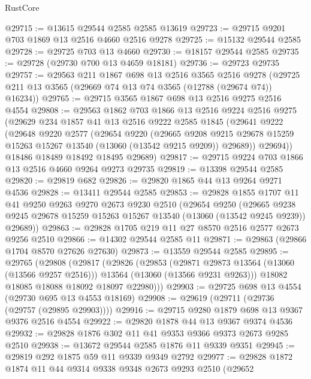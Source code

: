 \begin{lexlean}{RustCore}
\begin{coremodule}
@29715 := @13615 @29544 @2585 @2585 @13619
@29723 := @29715 @9201 @703 @1869 @13 @2516 @4660 @2516 @9278
@29725 := @15132 @29544 @2585
@29728 := @29725 @703 @13 @4660
@29730 := @18157 @29544 @2585
@29735 := @29728 (@29730 @700 @13 @4659 @18181)
@29736 := @29723 @29735
@29757 := @29563
    @211
    @1867
    @698
    @13
    @2516
    @3565
    @2516
    @9278
    (@29725 @211 @13 @3565 (@29669 @74 @13 @74 @3565 (@12788 (@29674 @74)) @16234))
@29765 := @29715 @3565 @1867 @698 @13 @2516 @9275 @2516 @4554
@29808 := @29563
    @1862
    @703
    @1866
    @13
    @2516
    @9224
    @2516
    @9275
    (@29629
      @234
      @1857
      @41
      @13
      @2516
      @9222
      @2585
      @1845
      (@29641
        @9222
        (@29648
          @9220
          @2577
          (@29654
            @9220
            (@29665
              @9208
              @9215
              @29678
              @15259
              @15263
              @15267
              @13540
              (@13060 (@13542 @9215 @9209))
              @29689))
          @29694))
      @18486
      @18489
      @18492
      @18495
      @29689)
@29817 := @29715 @9224 @703 @1866 @13 @2516 @4660 @9264 @9273 @29735
@29819 := @13398 @29544 @2585
@29820 := @29819 @682
@29826 := @29820 @1865 @44 @13 @9264 @9271 @4536
@29828 := @13411 @29544 @2585
@29853 := @29828
    @1855
    @1707
    @11
    @41
    @9250
    @9263
    @9270
    @2673
    @9230
    @2510
    (@29654
      @9250
      (@29665 @9238 @9245 @29678 @15259 @15263 @15267 @13540 (@13060 (@13542 @9245 @9239)) @29689))
@29863 := @29828 @1705 @219 @11 @27 @8570 @2516 @2577 @2673 @9256 @2510
@29866 := @14302 @29544 @2585 @11
@29871 := @29863 (@29866 @1704 @8570 @27626 @27630)
@29873 := @13559 @29544 @2585
@29895 := @29765
    (@29808
      (@29817
        (@29826
          (@29853
            (@29871 @29873 @13564 (@13060 (@13566 @9257 @2516)))
            @13564
            (@13060 (@13566 @9231 @9263)))
          @18082
          @18085
          @18088
          @18092
          @18097
          @22980)))
@29903 := @29725 @698 @13 @4554 (@29730 @695 @13 @4553 @18169)
@29908 := @29619 (@29711 (@29736 (@29757 (@29895 @29903))))
@29916 := @29715 @9280 @1879 @698 @13 @9367 @9376 @2516 @4554
@29922 := @29820 @1878 @44 @13 @9367 @9374 @4536
@29932 := @29828 @1876 @302 @11 @41 @9353 @9366 @9373 @2673 @9285 @2510
@29938 := @13672 @29544 @2585 @1876 @11 @9339 @9351
@29945 := @29819 @292 @1875 @59 @11 @9339 @9349 @2792
@29977 := @29828
    @1872
    @1874
    @11
    @44
    @9314
    @9338
    @9348
    @2673
    @9293
    @2510
    (@29652

\end{coremodule}
\end{lexlean}
